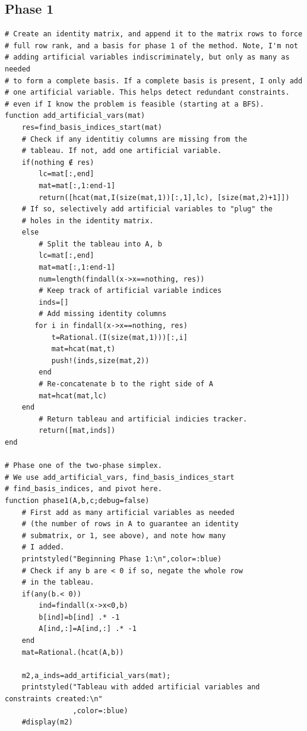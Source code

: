 \documentclass[11pt]{article}
\begin{document}
\subsection{Phase 1}
\label{sec:org15017a0}
\begin{verbatim}
# Create an identity matrix, and append it to the matrix rows to force
# full row rank, and a basis for phase 1 of the method. Note, I'm not
# adding artificial variables indiscriminately, but only as many as needed
# to form a complete basis. If a complete basis is present, I only add
# one artificial variable. This helps detect redundant constraints.
# even if I know the problem is feasible (starting at a BFS).
function add_artificial_vars(mat)
    res=find_basis_indices_start(mat)
    # Check if any identitiy columns are missing from the
    # tableau. If not, add one artificial variable.
    if(nothing ∉ res)
        lc=mat[:,end]
        mat=mat[:,1:end-1]
        return([hcat(mat,I(size(mat,1))[:,1],lc), [size(mat,2)+1]])
    # If so, selectively add artificial variables to "plug" the
    # holes in the identity matrix.
    else
        # Split the tableau into A, b
        lc=mat[:,end]
        mat=mat[:,1:end-1]
        num=length(findall(x->x==nothing, res))
        # Keep track of artificial variable indices
        inds=[]
        # Add missing identity columns
       for i in findall(x->x==nothing, res)
           t=Rational.(I(size(mat,1)))[:,i]
           mat=hcat(mat,t)
           push!(inds,size(mat,2))
        end
        # Re-concatenate b to the right side of A
        mat=hcat(mat,lc)
    end
        # Return tableau and artificial indicies tracker.
        return([mat,inds])
end

# Phase one of the two-phase simplex.
# We use add_artificial_vars, find_basis_indices_start
# find_basis_indices, and pivot here.
function phase1(A,b,c;debug=false)
    # First add as many artificial variables as needed
    # (the number of rows in A to guarantee an identity
    # submatrix, or 1, see above), and note how many
    # I added.
    printstyled("Beginning Phase 1:\n",color=:blue)
    # Check if any b are < 0 if so, negate the whole row
    # in the tableau.
    if(any(b.< 0))
        ind=findall(x->x<0,b)
        b[ind]=b[ind] .* -1
        A[ind,:]=A[ind,:] .* -1
    end
    mat=Rational.(hcat(A,b))

    m2,a_inds=add_artificial_vars(mat);
    printstyled("Tableau with added artificial variables and constraints created:\n"
                ,color=:blue)
    #display(m2)


\end{verbatim}
\end{document}
